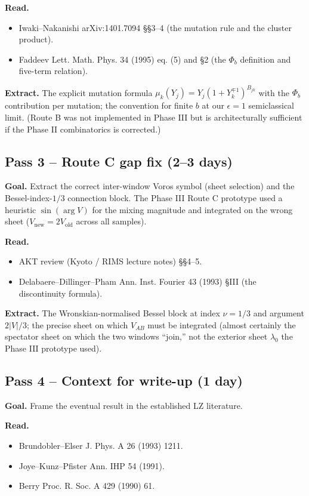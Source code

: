 \documentclass[11pt]{article}
\begin{document}
\textbf{Read.}
\begin{itemize}
 \item Iwaki--Nakanishi arXiv:1401.7094 \S\S3--4 (the mutation rule and
 the cluster product).
 \item Faddeev Lett. Math. Phys. 34 (1995) eq. (5) and \S2 (the
 $\Phi_b$ definition and five-term relation).
\end{itemize}

\textbf{Extract.} The explicit mutation formula
$\mu_k(Y_j) = Y_j (1 + Y_k^{\mp 1})^{B_{jk}}$ with the $\Phi_b$
contribution per mutation; the convention for finite $b$ at our
$\epsilon = 1$ semiclassical limit. (Route B was not implemented in
Phase III but is architecturally sufficient if the Phase II
combinatorics is corrected.)

\subsection*{Pass 3 -- Route C gap fix (\textbf{2--3 days})}

\textbf{Goal.} Extract the correct inter-window Voros symbol (sheet
selection) and the Bessel-index-$1/3$ connection block. The Phase III
Route C prototype used a heuristic $\sin(\arg V)$ for the mixing
magnitude and integrated on the wrong sheet
($V_{\mathrm{new}} = 2 V_{\mathrm{old}}$ across all samples).

\textbf{Read.}
\begin{itemize}
 \item AKT review (Kyoto / RIMS lecture notes) \S\S4--5.
 \item Delabaere--Dillinger--Pham Ann. Inst. Fourier 43 (1993)
 \S III (the discontinuity formula).
\end{itemize}

\textbf{Extract.} The Wronskian-normalised Bessel block at index
$\nu = 1/3$ and argument $2 |V| / 3$; the precise sheet on which
$V_{AB}$ must be integrated (almost certainly the spectator sheet on
which the two windows ``join,'' not the exterior sheet $\lambda_0$
the Phase III prototype used).

\subsection*{Pass 4 -- Context for write-up (\textbf{1 day})}

\textbf{Goal.} Frame the eventual result in the established LZ
literature.

\textbf{Read.}
\begin{itemize}
 \item Brundobler--Elser J. Phys. A 26 (1993) 1211.
 \item Joye--Kunz--Pfister Ann. IHP 54 (1991).
 \item Berry Proc. R. Soc. A 429 (1990) 61.
\end{itemize}
\end{document}
